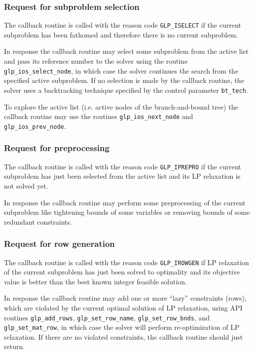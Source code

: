 \subsubsection*{Request for subproblem selection}

The callback routine is called with the reason code \verb|GLP_ISELECT|
if the current subproblem has been fathomed and therefore there is no
current subproblem.

In response the callback routine may select some subproblem from the
active list and pass its reference number to the solver using the
routine \verb|glp_ios_select_node|, in which case the solver continues
the search from the specified active subproblem. If no selection is made
by the callback routine, the solver uses a backtracking technique
specified by the control parameter \verb|bt_tech|.

To explore the active list (i.e. active nodes of the branch-and-bound
tree) the callback routine may use the routines \verb|glp_ios_next_node|
and \verb|glp_ios_prev_node|.

\subsubsection*{Request for preprocessing}

The callback routine is called with the reason code \verb|GLP_IPREPRO|
if the current subproblem has just been selected from the active list
and its LP relaxation is not solved yet.

In response the callback routine may perform some preprocessing of the
current subproblem like tightening bounds of some variables or removing
bounds of some redundant constraints.

\subsubsection*{Request for row generation}

The callback routine is called with the reason code \verb|GLP_IROWGEN|
if LP relaxation of the current subproblem has just been solved to
optimality and its objective value is better than the best known integer
feasible solution.

In response the callback routine may add one or more ``lazy''
constraints (rows), which are violated by the current optimal solution
of LP relaxation, using API routines \verb|glp_add_rows|,
\verb|glp_set_row_name|, \verb|glp_set_row_bnds|, and
\verb|glp_set_mat_row|, in which case the solver will perform
re-optimization of LP relaxation. If there are no violated constraints,
the callback routine should just return.

